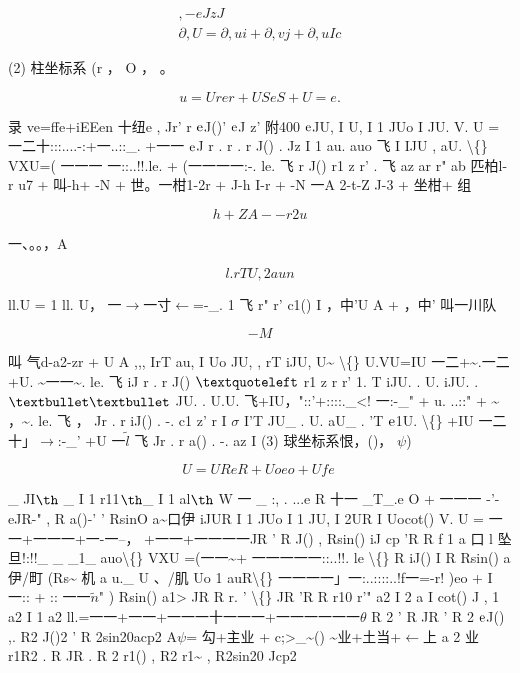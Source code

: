\begin{gather*}
, - eJ z J\\
\partial ,U = \partial ,ui + \partial ,vj + \partial ,uIc
\end{gather*}

(2) 柱坐标系 (r ， O ， 。

\[u = Urer+USeS+U=e.\]

录 ve=ffe+iEEen 十纽e , Jr' r ${\rm e}$J()' ${\rm e}$J z' 附400 ${\rm e}$JU, I U, I 1 JUo I JU. V. U = 一二十:::....-:+一..::\_. +一一 ${\rm e}$J r . r . r J() . Jz I 1 au. auo 飞 I IJU , aU. \textbackslash\{\} VXU=( 一一一 一::..!!.le. + (一一一一:-. le. 飞 r J() r1 z r' . 飞 az ar r" ab 匹柏l-r u7 + 叫-h+ -N + 世。一柑1-2r + J-h I-r + -N 一A 2-t-Z J-3 + 坐柑+ 组

\[h+ ZA--r 2u\]

一、。。，A

\[l.rT U, 2 aun  \]

ll.U = 1 ll. U， 一$\rightarrow$一寸$\leftarrow$=-\_. 1 飞 r" r' c1() I ，中'U A + ，中' 叫一川队

\[-M\]

叫 气d-a2-zr + U A ,,, IrT au, I Uo JU, , rT iJU, U\textasciitilde{} \textbackslash\{\} U.VU=IU 一二+\textasciitilde{}.一二 +U. \textasciitilde{}一一\textasciitilde{}. le. 飞 iJ r . r J() ${\rm ‘}$ r1 z r r' 1. T iJU. . U. iJU. . ${\rm ••}$ JU. . U.U. 飞+IU，"::'+::::.\_<! 一:-\_" + u. ..::" + \textasciitilde{} ，\textasciitilde{}. le. 飞 ， Jr . r iJ() . -. c1 z' r I $\sigma$ I'T JU\_ . U. aU\_ . 'T ${\rm e}$1U. \textbackslash\{\} +IU 一二十」$\rightarrow$:-\_' +U 一$\tilde{l}$ 飞 Jr . r a() . -. az I (3) 球坐标系恨，()， $\psi$)

\[U = UReR + Uoeo + Ufe~\]

\_ JI${\rm þ}$ \_ I 1 r11${\rm þ}$\_ I 1 al${\rm þ}$ W 一 \_ :, . ...e R 十一 \_T\_.e O + 一一一 -'-eJR-" , R a()-' ' RsinO a\textasciitilde{}口伊 iJUR I 1 JUo I 1 JU, I 2UR I Uocot() V. U = 一一+一一一+一-一--， +一一+一一一一JR ' R J() , Rsin() iJ cp 'R R f 1 a 口 l 坠旦!:!!\_ \_ \_1\_ auo\textbackslash\{\} VXU =(一一\textasciitilde{}+ 一一一一一::..!!. le \textbackslash\{\} R iJ() I R Rsin() a伊/町 (Rs\textasciitilde{} 机 a u.\_ U 、/肌 Uo 1 auR\textbackslash\{\} 一一一一」一:..::::..!f一=-r! )eo + I 一:: + :: 一一$\tilde{n}$" ) Rsin() a1> JR R r. ' \textbackslash\{\} JR 'R R r10 r'" a2 I 2 a I cot() J , 1 a2 I 1 a2 ll.=一一+一一+一一一十一一一+一一一一一一$\theta$ R 2 ' R JR ' R 2 ${\rm e}$J() ,. R2 J()2 ' R 2sin20acp2 A$\psi$= 勾+主业 + c;>\_\textasciitilde{}() \textasciitilde{}业+土当+$\leftarrow$上 a 2 业 r1R2 . R JR . R 2 r1() , R2 r1\textasciitilde{} , R2sin20 Jcp2


